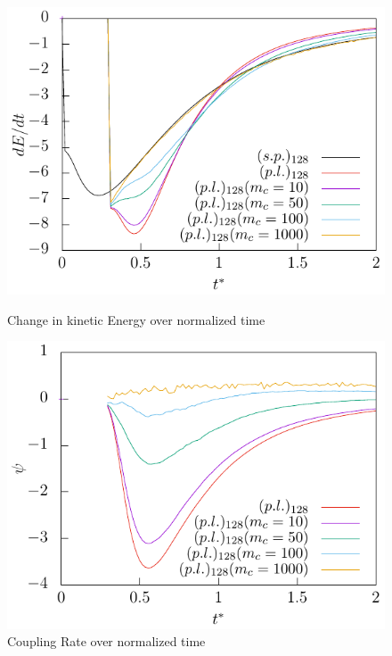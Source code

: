 \documentclass[a4paper,10pt]{article}
\numberwithin{equation}{section} %
\begin{document}
\begin{figure}[h]
    \centering
    \begin{minipage}{.5\textwidth}
        \centering
        \includegraphics[width=\linewidth]{./../Simulationsergebnisse/variationWolken/128/der(kineticEnergy)_time.pdf}
        \caption{Change in kinetic Energy over normalized time}
        \label{der(kineticEnergy)_time_128}
    \end{minipage}%
    \begin{minipage}{0.5\textwidth}
        \centering
        \includegraphics[width=\linewidth]{./../Simulationsergebnisse/variationWolken/128/coupling_time.pdf}
        \caption{Coupling Rate over normalized time}
        \label{coupling_time_128}
    \end{minipage}
\end{figure}
\end{document}
